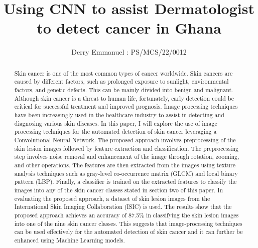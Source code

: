 \documentclass[twocolumn]{article}
\title{Using CNN to assist Dermatologist to detect cancer in Ghana}
\author{Derry Emmanuel : PS/MCS/22/0012}
\date{}
\begin{document}
\maketitle

\begin{abstract}
Skin cancer is one of the most common types of cancer worldwide.  Skin cancers are caused by different factors, such as prolonged exposure to sunlight, environmental factors, and genetic defects. This can be mainly divided into benign and malignant. Although skin cancer is a threat to human life, fortunately, early detection could be critical for successful treatment and improved prognosis. Image processing techniques have been increasingly used in the healthcare industry to assist in detecting and diagnosing various skin diseases. In this paper, I will explore the use of image processing techniques for the automated detection of skin cancer leveraging a Convolutional Neural Network. The proposed approach involves preprocessing of the skin lesion images followed by feature extraction and classification. The preprocessing step involves noise removal and enhancement of the image through rotation, zooming, and other operations.  The features are then extracted from the images using texture analysis techniques such as gray-level co-occurrence matrix (GLCM) and local binary pattern (LBP). Finally, a classifier is trained on the extracted features to classify the images into any of the skin cancer classes stated in section two of this paper. In evaluating the proposed approach, a dataset of skin lesion images from the International Skin Imaging Collaboration (ISIC) is used. The results show that the proposed approach achieves an accuracy of 87.5\% in classifying the skin lesion images into one of the nine skin cancer classes. This suggests that image-processing techniques can be used effectively for the automated detection of skin cancer and it can further be enhanced using Machine Learning models.
\end{abstract}
\end{document}
